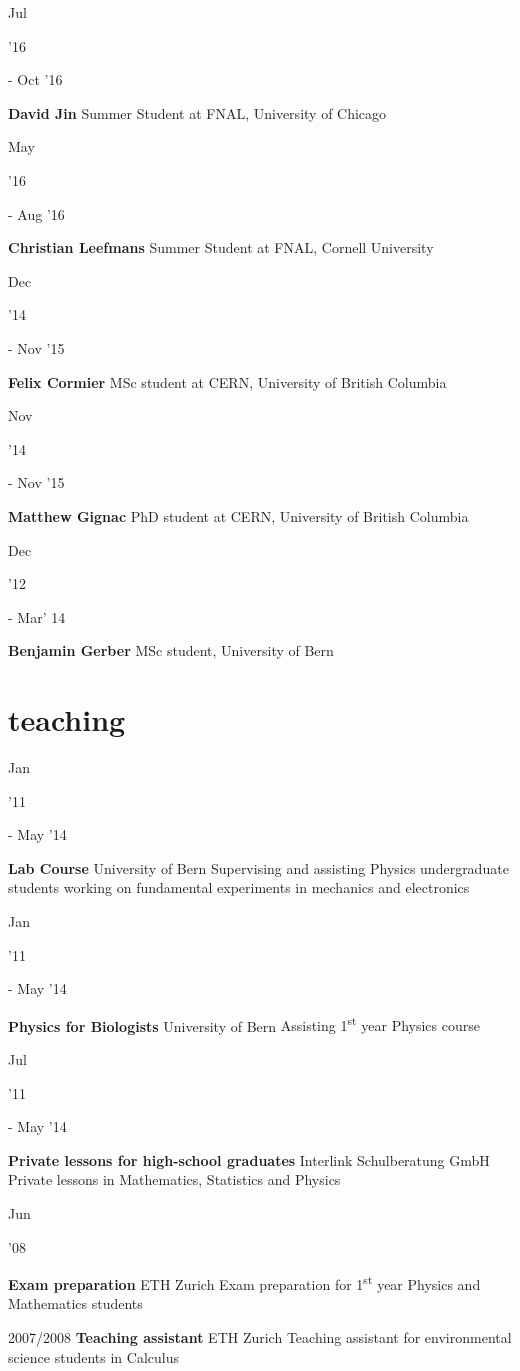 \documentclass[]{cv} %
\begin{document}
\begin{entrylist}

  \entry
  {\parbox[t]{\parboxWidthOne}{Jul}\parbox[t]{\parboxWidthTwo}{\hfill '16} - Oct '16}
  {\textbf{David Jin}}
  {}
  {Summer Student at FNAL, University of Chicago}

  \entry
  {\parbox[t]{\parboxWidthOne}{May}\parbox[t]{\parboxWidthTwo}{\hfill '16} - Aug '16}
  {\textbf{Christian Leefmans}}
  {}
  {Summer Student at FNAL, Cornell University}

  \entry
  {\parbox[t]{\parboxWidthOne}{Dec}\parbox[t]{\parboxWidthTwo}{\hfill '14} - Nov '15}
  {\textbf{Felix Cormier}}
  {}
  {MSc student at CERN, University of British Columbia}

  \entry
  {\parbox[t]{\parboxWidthOne}{Nov}\parbox[t]{\parboxWidthTwo}{\hfill '14} - Nov '15}
  {\textbf{Matthew Gignac}}
  {}
  {PhD student at CERN, University of British Columbia}

  \entry
  {\parbox[t]{\parboxWidthOne}{Dec}\parbox[t]{\parboxWidthTwo}{\hfill '12} - Mar' 14}
  {\textbf{Benjamin Gerber}}
  {}
  {MSc student, University of Bern}

\end{entrylist}

\section{teaching}

\begin{entrylist}

  \entry
  {\parbox[t]{\parboxWidthOne}{Jan}\parbox[t]{\parboxWidthTwo}{\hfill '11} - May '14}
  {\textbf{Lab Course}}
  {University of Bern}
  {Supervising and assisting Physics undergraduate students working on fundamental experiments in mechanics and electronics}

  \entry
  {\parbox[t]{\parboxWidthOne}{Jan}\parbox[t]{\parboxWidthTwo}{\hfill '11} - May '14}
  {\textbf{Physics for Biologists}}
  {University of Bern}
  {Assisting 1\textsuperscript{st} year Physics course}

  \entry
  {\parbox[t]{\parboxWidthOne}{Jul}\parbox[t]{\parboxWidthTwo}{\hfill '11} - May '14}
  {\textbf{Private lessons for high-school graduates}}
  {Interlink Schulberatung GmbH}
  {Private lessons in Mathematics, Statistics and Physics}

  \entry
  {\parbox[t]{\parboxWidthOne}{Jun}\parbox[t]{\parboxWidthTwo}{\hfill '08}}
  {\textbf{Exam preparation}}
  {ETH Zurich}
  {Exam preparation for 1\textsuperscript{st} year Physics and Mathematics students}

  \entry
  {2007/2008}
  {\textbf{Teaching assistant}}
  {ETH Zurich}
  {Teaching assistant for environmental science students in Calculus}

\end{entrylist}
\end{document}
